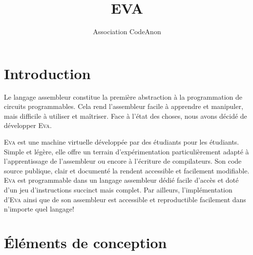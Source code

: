 \documentclass[11pt,twoside,french]{article}
\newcommand{\noun}[1]{\textsc{#1}}
\begin{document}
\title{EVA}
\author{Association CodeAnon}

\maketitle
\clearpage{}

\tableofcontents{}

\cleardoublepage{}

\vfill{}


\section{Introduction}

Le langage assembleur constitue la première abstraction à la programmation
de circuits programmables. Cela rend l'assembleur facile à apprendre
et manipuler, mais difficile à utiliser et maîtriser. Face à l'état
des choses, nous avons décidé de développer \noun{Eva}.

\noun{Eva} est une machine virtuelle développée par des étudiants pour les
étudiants. Simple et légère, elle offre un terrain d'expérimentation
particulièrement adapté à l'apprentissage de l'assembleur ou encore
à l'écriture de compilateurs. Son code source publique, clair et documenté
la rendent accessible et facilement modifiable. \noun{Eva} est programmable
dans un langage assembleur dédié facile d'accès et doté d'un jeu d'instructions
succinct mais complet. Par ailleurs, l'implémentation d'\noun{Eva} ainsi
que de son assembleur est accessible et reproductible facilement dans
n'importe quel langage!

\vfill{}
\newpage{}

\section{Éléments de conception}
\end{document}
